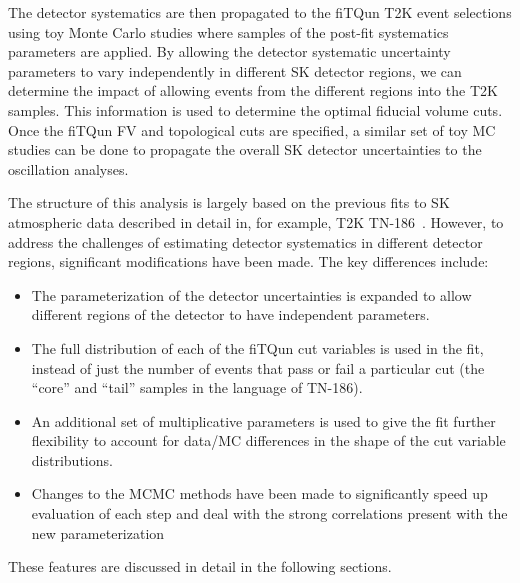 The detector systematics are then propagated to the fiTQun T2K event selections
using toy Monte Carlo studies where samples of the post-fit systematics
parameters are applied.  By allowing the detector systematic uncertainty
parameters to vary independently in different SK detector regions, we can
determine the impact of allowing events from the different regions into the T2K
samples.  This information is used to determine the optimal fiducial volume
cuts. Once the fiTQun FV and topological cuts are specified, a similar set of
toy MC studies can be done to propagate the overall SK detector uncertainties
to the oscillation analyses.

The structure of this analysis is largely based on the previous fits to SK
atmospheric data described in detail in, for example, T2K TN-186~\cite{tn186}.
However, to address the challenges of estimating detector systematics in
different detector regions, significant modifications have been made. The key
differences include:
%
\begin{itemize}
  \item The parameterization of the detector uncertainties is expanded to allow
    different regions of the detector to have independent 
    parameters.
  \item The full distribution of each of the fiTQun cut variables is used in
    the fit, instead of just the number of events that pass or fail a particular
    cut (the ``core'' and ``tail'' samples in the language of TN-186).  
  \item An additional set of multiplicative parameters is used to give the fit
    further flexibility to account for data/MC differences in the shape of the
    cut variable distributions.
  \item Changes to the MCMC methods have been made to significantly speed up
    evaluation of each step and deal with the strong correlations present with
    the new parameterization
\end{itemize}
%
These features are discussed in detail in the following sections.




